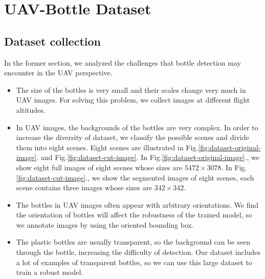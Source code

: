 \section{UAV-Bottle Dataset}
\label{sec:dataset}


\subsection{Dataset collection}
\label{ssec:image_collection}

In the former section, we analyzed the challenges that bottle detection may encounter in the UAV perspective.
\begin{itemize}
	\item The size of the bottles is very small and their scales change very much in UAV images. For solving this problem, we collect images at different flight altitudes.
	
	\item In UAV images, the backgrounds of the bottles are very complex. In order to increase the diversity of dataset, we classify the possible scenes and divide them into eight scenes. Eight scenes are illustrated in Fig.\ref{fig:dataset-original-image}. and Fig.\ref{fig:dataset-cut-image}. In Fig.\ref{fig:dataset-original-image}., we show eight full images of eight scenes whose sizes are $ 5472\times 3078 $. In Fig.\ref{fig:dataset-cut-image}., we show the segmented images of eight scenes, each scene contains three images whose sizes are $ 342 \times 342 $.
	
	\item The bottles in UAV images often appear with arbitrary orientations. We find the orientation of bottles will affect the robustness of the trained model, so we annotate images by using the oriented bounding box.
	
	\item The plastic bottles are usually transparent, so the background can be seen through the bottle, increasing the difficulty of detection. Our dataset includes a lot of examples of  transparent bottles, so we can use this large dataset to train a robust model.
\end{itemize}
